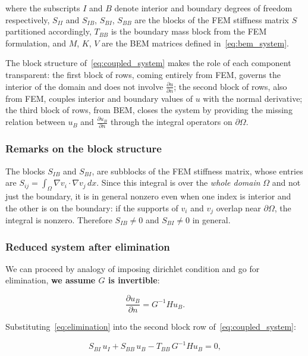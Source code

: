 \documentclass[11pt,onecolumn]{article}
\begin{document}
where the subscripts $I$ and $B$ denote interior and boundary degrees of freedom respectively, $S_{II}$ and $S_{IB}$, $S_{BI}$, $S_{BB}$ are the blocks of the FEM stiffness matrix $S$ partitioned accordingly, $T_{BB}$ is the boundary mass block from the FEM formulation, and $M$, $K$, $V$ are the BEM matrices defined in~\eqref{eq:bem_system}. 

The block structure of~\eqref{eq:coupled_system} makes the role of each component transparent: the first block of rows, coming entirely from FEM, governs the interior of the domain and does not involve $\frac{\partial u}{\partial n}$; the second block of rows, also from FEM, couples interior and boundary values of $u$ with the normal derivative; the third block of rows, from BEM, closes the system by providing the missing relation between $u_B$ and $\frac{\partial u_B}{\partial n}$ through the integral operators on $\partial\Omega$.


\subsubsection{Remarks on the block structure}
The blocks $S_{IB}$ and $S_{BI}$, are subblocks of the FEM stiffness matrix, whose entries are $S_{ij} = \int_{\Omega} \nabla v_i \cdot \nabla v_j \, dx$. Since this integral is over the \textit{whole domain} $\Omega$ and not just the boundary, it is in general nonzero even when one index is interior and the other is on the boundary: if the supports of $v_i$ and $v_j$ overlap near $\partial\Omega$, the integral is nonzero. Therefore $S_{IB} \neq 0$ and $S_{BI} \neq 0$ in general.


\subsubsection{Reduced system after elimination}

We can proceed by analogy of imposing dirichlet condition and go for elimination, \textbf{we assume $G$ is invertible}:

\begin{equation}
\frac{\partial u_B}{\partial n} = G^{-1}H u_B.
\label{eq:elimination}
\end{equation}

Substituting~\eqref{eq:elimination} into the second block row of~\eqref{eq:coupled_system}:

\begin{equation}
S_{BI}\, u_I + S_{BB}\, u_B - T_{BB}\, G^{-1}H u_B = 0,
\end{equation}
\end{document}

